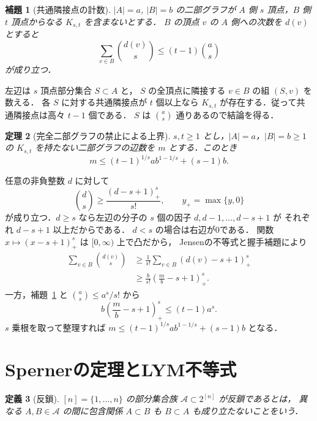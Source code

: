 \documentclass[a5paper,10pt,onecolumn]{jsarticle}
\makeatletter
\theoremstyle{mathnotetheorem}
\newtheorem{theorem}{定理}[section]
\newtheorem{definition}[theorem]{定義}
\newtheorem{lemma}[theorem]{補題}
\renewcommand{\proofname}{証明}
\renewenvironment{proof}[1][\proofname]{%
  \par\pushQED{\qed}\normalfont\topsep4\p@\@plus2\p@\relax
  \trivlist\item[\hskip\labelsep\bfseries #1]\ignorespaces
}{\popQED\endtrivlist\@endpefalse}
\makeatother
\begin{document}
\begin{lemma}[共通隣接点の計数]\label{lem:kstdouble}
$|A|=a$, $|B|=b$ の二部グラフが
$A$ 側 $s$ 頂点，$B$ 側 $t$ 頂点からなる $K_{s,t}$ を含まないとする．
$B$ の頂点 $v$ の $A$ 側への次数を $d(v)$ とすると
\begin{equation}\label{eq:kstdouble}
 \sum_{v\in B}{d(v)\choose s}
 \le (t-1){a\choose s}
\end{equation}
が成り立つ．
\end{lemma}
\begin{proof}
左辺は $s$ 頂点部分集合 $S\subset A$ と，
$S$ の全頂点に隣接する $v\in B$ の組 $(S,v)$ を数える．
各 $S$ に対する共通隣接点が $t$ 個以上なら
$K_{s,t}$ が存在する．従って共通隣接点は高々 $t-1$ 個である．
$S$ は ${a\choose s}$ 通りあるので結論を得る．
\end{proof}

\begin{theorem}[完全二部グラフの禁止による上界]\label{thm:kst}
$s,t\ge1$ とし，$|A|=a$，$|B|=b\ge1$ の
$K_{s,t}$ を持たない二部グラフの辺数を $m$ とする．このとき
\[
 m\le (t-1)^{1/s}a b^{1-1/s}+(s-1)b.
\]
\end{theorem}
\begin{proof}
任意の非負整数 $d$ に対して
\[
 {d\choose s}\ge \frac{(d-s+1)_+^s}{s!},
 \qquad y_+=\max\{y,0\}
\]
が成り立つ．$d\ge s$ なら左辺の分子の
$s$ 個の因子 $d,d-1,\ldots,d-s+1$ が
それぞれ $d-s+1$ 以上だからである．
$d<s$ の場合は右辺が0である．
関数 $x\mapsto(x-s+1)_+^s$ は $[0,\infty)$ 上で凸だから，
Jensenの不等式と握手補題により
\[
 \begin{aligned}
 \sum_{v\in B}{d(v)\choose s}
 &\ge\frac1{s!}\sum_{v\in B}(d(v)-s+1)_+^s\\
 &\ge\frac b{s!}\left(\frac mb-s+1\right)_+^s.
 \end{aligned}
\]
一方，補題~\ref{lem:kstdouble} と
${a\choose s}\le a^s/s!$ から
\[
 b\left(\frac mb-s+1\right)_+^s
 \le (t-1)a^s.
\]
$s$ 乗根を取って整理すれば
$m\le (t-1)^{1/s}ab^{1-1/s}+(s-1)b$ となる．
\end{proof}

\section{Spernerの定理とLYM不等式}
\begin{definition}[反鎖]
$[n]=\{1,\ldots,n\}$ の部分集合族
$\mathcal A\subset2^{[n]}$ が\emph{反鎖}であるとは，
異なる $A,B\in\mathcal A$ の間に包含関係
$A\subset B$ も $B\subset A$ も成り立たないことをいう．
\end{definition}
\end{document}
